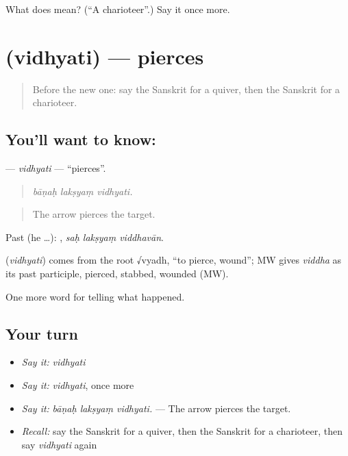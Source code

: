 \begin{tcolorbox}[breakable,colback=teal!4,colframe=teal!35!black,title={Before you move on}]
What does  mean? (\textquotedblleft{}A charioteer\textquotedblright{}.) Say it once more.
\end{tcolorbox}
\section[\texorpdfstring{\sk{विध्यति} (vidhyati)}{विध्यति (vidhyati)}]{ (vidhyati) — pierces}

\label{lesson:SA-C325-vidhyati}



\begin{quote}
Before the new one: say the Sanskrit for a quiver, then the Sanskrit for a charioteer.
\end{quote}

\subsection*{You'll want to know: }
\textbf{} — \emph{vidhyati} — \textquotedblleft{}pierces\textquotedblright{}.

\begin{quote}
  
\end{quote}

\begin{quote}
\emph{bāṇaḥ lakṣyaṃ vidhyati.}
\end{quote}

\begin{quote}
The arrow pierces the target.
\end{quote}

Past (he …):   , \emph{saḥ lakṣyaṃ viddhavān}.

\begin{cousinweb}
\textbf{} (\emph{vidhyati}) comes from the root √vyadh, \textquotedblleft{}to pierce, wound\textquotedblright{}; MW gives \emph{viddha} as its past participle, pierced, stabbed, wounded (MW).
\end{cousinweb}

\begin{grammarlens}[title={What you've built}]
One more word for telling what happened.
\end{grammarlens}

\subsection*{Your turn}
\begin{itemize}
\raggedright
  \item \emph{Say it:} \emph{vidhyati}
  \item \emph{Say it:} \emph{vidhyati}, once more
  \item \emph{Say it:} \emph{bāṇaḥ lakṣyaṃ vidhyati.} — The arrow pierces the target.
  \item \emph{Recall:} say the Sanskrit for a quiver, then the Sanskrit for a charioteer, then say \emph{vidhyati} again
\end{itemize}


